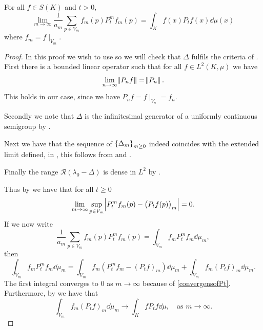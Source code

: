 \begin{lemma}\label{convergenceOfSemigroups}
	For all $f \in S(K)$ and $t > 0$,
	\begin{equation}
		\lim_{m \to \infty} \frac{1}{a_m} \sum_{p \in V_m} f_m(p)P_t^{m} f_m(p) = \int_{K}f(x)P_tf(x) \dd\mu (x)
	\end{equation}
	where $f_m = f \mid_{V_m}$.
\end{lemma}
\begin{proof}
	In this proof we wish to use \cite[Theorem 2.1]{KURTZ1969354}  so we will check that $\Delta$ fulfils the criteria of \cite[Theorem 2.1]{KURTZ1969354}. First there is a bounded linear operator such that for all $f \in L^{2}(K, \mu)$ we have
	$$\lim_{n \to \infty} \norm{P_n f} = \norm{P_n}.$$
	 This holds in our case, since we have $P_n f = f \mid_{V_n} = f_n$.
	
	Secondly we note that $\Delta$ is the infinitesimal generator of a uniformly continuous semigroup by .
	
	Next we have that the sequence of $\cbr{\Delta_m}_{m \geq 0}$ indeed coincides with the extended limit defined, in \cite[355]{KURTZ1969354}, this follows from  and . 
	
	Finally the range $\mathcal{R}(\lambda_0 - \Delta)$ is dense in $L^2$ by \cite[Lemma 1.1.1]{fabriceDirichelt}.
	
	\noi Thus by \cite[Theorem 2.1]{KURTZ1969354}  we have that for all $t \geq 0$
	\begin{equation}\label{convergensofPt}
		\lim_{m \to \infty} \sup_{p \in V_m} \abs{P_t^{m}f_m(p) - \left(P_t f(p)\right)_m} = 0.
	\end{equation}
	If we now write 
	\begin{equation}
		\frac{1}{a_m} \sum_{p \in V_m} f_m(p) P_t^{m}f_m(p) = \int_{V_m} f_m P_t^{m} f_m \dd \mu_m,
	\end{equation}
	then
	\begin{equation}
		\int_{V_m} f_m P_t^{m} f_m \dd\mu_m = \int_{V_m} f_m \left(P_t^{m} f_m - (P_t f)_m \right) \dd\mu_m + \int_{V_m} f_m (P_t f)_m \dd \mu_m .
	\end{equation}
	The first integral converges to $0$ as $m\to \infty$ because of \eqref{convergensofPt}. Furthermore, by  we have that
	\begin{equation}
		\int_{V_m} f_m (P_t f)_m \dd \mu_m \to \int_{K} fP_tf \dd \mu,\quad \text{as } m \to \infty.
	\end{equation}
\end{proof}

